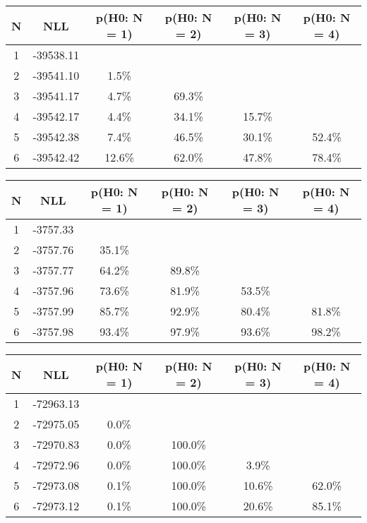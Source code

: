 \begin{table}[htb]
	\begin{center}
{\footnotesize\renewcommand{\arraystretch}{1.4}
		\begin{tabular}{cc||cccc}
			N & NLL & p(H0: N = 1) & p(H0: N = 2) & p(H0: N = 3) & p(H0: N = 4)\\ 
		\hline
1 & -39538.11 & & & & \\
2 & -39541.10 & 1.5\% & & & \\
3 & -39541.17 & 4.7\% & 69.3\% & & \\
4 & -39542.17 & 4.4\% & 34.1\% & 15.7\% & \\
5 & -39542.38 & 7.4\% & 46.5\% & 30.1\% & 52.4\% \\
6 & -39542.42 & 12.6\% & 62.0\% & 47.8\% & 78.4\% \\
	\end{tabular}
		\label{tab:lab}
	}
	\end{center}\end{table}

\begin{table}[htb]
	\begin{center}
{\footnotesize\renewcommand{\arraystretch}{1.4}
		\begin{tabular}{cc||cccc}
			N & NLL & p(H0: N = 1) & p(H0: N = 2) & p(H0: N = 3) & p(H0: N = 4)\\ 
		\hline
1 & -3757.33 & & & & \\
2 & -3757.76 & 35.1\% & & & \\
3 & -3757.77 & 64.2\% & 89.8\% & & \\
4 & -3757.96 & 73.6\% & 81.9\% & 53.5\% & \\
5 & -3757.99 & 85.7\% & 92.9\% & 80.4\% & 81.8\% \\
6 & -3757.98 & 93.4\% & 97.9\% & 93.6\% & 98.2\% \\
	\end{tabular}
		\label{tab:lab}
	}
	\end{center}\end{table}

\begin{table}[htb]
	\begin{center}
{\footnotesize\renewcommand{\arraystretch}{1.4}
		\begin{tabular}{cc||cccc}
			N & NLL & p(H0: N = 1) & p(H0: N = 2) & p(H0: N = 3) & p(H0: N = 4)\\ 
		\hline
1 & -72963.13 & & & & \\
2 & -72975.05 & 0.0\% & & & \\
3 & -72970.83 & 0.0\% & 100.0\% & & \\
4 & -72972.96 & 0.0\% & 100.0\% & 3.9\% & \\
5 & -72973.08 & 0.1\% & 100.0\% & 10.6\% & 62.0\% \\
6 & -72973.12 & 0.1\% & 100.0\% & 20.6\% & 85.1\% \\
	\end{tabular}
		\label{tab:lab}
	}
	\end{center}\end{table}

